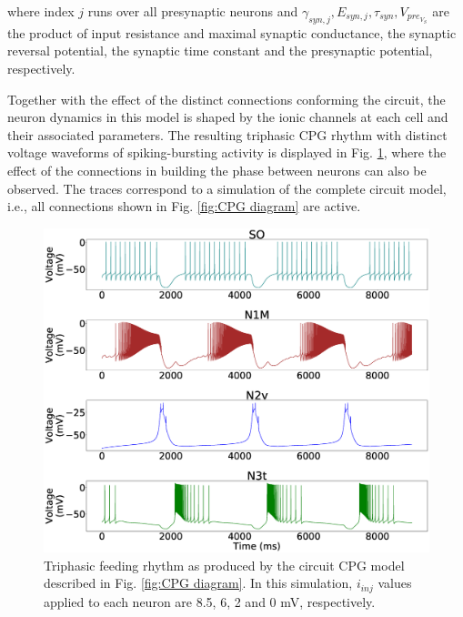 \noindent where index $j$ runs over all presynaptic neurons and \(\gamma_{syn,j}, E_{syn,j},\tau_{syn},V_{pre_{V_S}}\) are the product of input resistance and maximal synaptic conductance, the synaptic reversal potential, the synaptic time constant and the presynaptic potential, respectively.

Together with the effect of the distinct connections conforming the circuit, the neuron dynamics in this model is shaped by the ionic channels at each cell and their associated parameters. The resulting triphasic CPG rhythm with distinct voltage waveforms of spiking-bursting activity is displayed in Fig. \ref{fig:model simulation}, where the effect of the connections in building the phase between neurons can also be observed. The traces correspond to a simulation of the complete circuit model, i.e., all connections shown in Fig. \ref{fig:CPG diagram} are active. 


\begin{figure}[h!]
    \centering
    \includegraphics[width=\linewidth]{img/methods-paper-modelo/figure2.eps}
    \caption{Triphasic feeding rhythm as produced by the circuit CPG model described in Fig. \ref{fig:CPG diagram}. In this simulation, $i_{inj}$ values applied to each neuron are 8.5, 6, 2 and 0 mV, respectively.}
    \label{fig:model simulation}
\end{figure}

